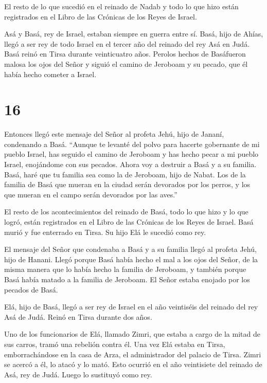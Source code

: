  El resto de lo que sucedió en el reinado de Nadab y todo
lo que hizo están registrados en el Libro de las Crónicas de los Reyes
de Israel.

 Asá y Basá, rey de Israel, estaban siempre en guerra entre
sí.  Basá, hijo de Ahías, llegó a ser rey de todo Israel en
el tercer año del reinado del rey Asá en Judá. Basá reinó en Tirsa
durante veinticuatro años.  Perolos hechos de Basáfueron
malosa los ojos del Señor y siguió el camino de Jeroboam y su pecado,
que él había hecho cometer a Israel.

\hypertarget{section-15}{%
\section{16}\label{section-15}}

 Entonces llegó este mensaje del Señor al profeta Jehú, hijo
de Jananí, condenando a Basá.  ``Aunque te levanté del polvo
para hacerte gobernante de mi pueblo Israel, has seguido el camino de
Jeroboam y has hecho pecar a mi pueblo Israel, enojándome con sus
pecados.  Ahora voy a destruir a Basá y a su familia. Basá,
haré que tu familia sea como la de Jeroboam, hijo de Nabat. 
Los de la familia de Basá que mueran en la ciudad serán devorados por
los perros, y los que mueran en el campo serán devorados por las aves.''

 El resto de los acontecimientos del reinado de Basá, todo
lo que hizo y lo que logró, están registrados en el Libro de las
Crónicas de los Reyes de Israel.  Basá murió y fue enterrado
en Tirsa. Su hijo Elá le sucedió como rey.

 El mensaje del Señor que condenaba a Basá y a su familia
llegó al profeta Jehú, hijo de Hanani. Llegó porque Basá había hecho el
mal a los ojos del Señor, de la misma manera que lo había hecho la
familia de Jeroboam, y también porque Basá había matado a la familia de
Jeroboam. El Señor estaba enojado por los pecados de Basá.

 Elá, hijo de Basá, llegó a ser rey de Israel en el año
veintiséis del reinado del rey Asá de Judá. Reinó en Tirsa durante dos
años.

 Uno de los funcionarios de Elá, llamado Zimri, que estaba a
cargo de la mitad de sus carros, tramó una rebelión contra él. Una vez
Elá estaba en Tirsa, emborrachándose en la casa de Arza, el
administrador del palacio de Tirsa.  Zimri se acercó a él,
lo atacó y lo mató. Esto ocurrió en el año veintisiete del reinado de
Asá, rey de Judá. Luego lo sustituyó como rey.

